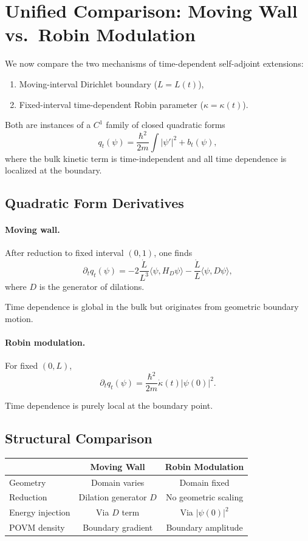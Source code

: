 \documentclass[11pt,a4paper]{article}
\begin{document}
\section{Unified Comparison: Moving Wall vs.\ Robin Modulation}

We now compare the two mechanisms of time-dependent self-adjoint
extensions:

\begin{enumerate}
\item Moving-interval Dirichlet boundary ($L=L(t)$),
\item Fixed-interval time-dependent Robin parameter ($\kappa=\kappa(t)$).
\end{enumerate}

Both are instances of a $C^1$ family of closed quadratic forms
\[
q_t(\psi)
=
\frac{\hbar^2}{2m}\int |\psi'|^2
+
b_t(\psi),
\]
where the bulk kinetic term is time-independent and
all time dependence is localized at the boundary.

\subsection{Quadratic Form Derivatives}

\paragraph{Moving wall.}

After reduction to fixed interval $(0,1)$, one finds
\[
\partial_t q_t(\psi)
=
-2\frac{\dot L}{L^3}
\langle \psi, H_D \psi\rangle
-
\frac{\dot L}{L}
\langle \psi, D \psi\rangle,
\]
where $D$ is the generator of dilations.

Time dependence is global in the bulk but originates from
geometric boundary motion.

\paragraph{Robin modulation.}

For fixed $(0,L)$,
\[
\partial_t q_t(\psi)
=
\frac{\hbar^2}{2m}
\dot\kappa(t)|\psi(0)|^2.
\]

Time dependence is purely local at the boundary point.

\subsection{Structural Comparison}

\begin{center}
\begin{tabular}{l|c|c}
 & Moving Wall & Robin Modulation \\ \hline
Geometry & Domain varies & Domain fixed \\
Reduction & Dilation generator $D$ & No geometric scaling \\
Energy injection & Via $D$ term & Via $|\psi(0)|^2$ \\
POVM density & Boundary gradient & Boundary amplitude
\end{tabular}
\end{center}
\end{document}

